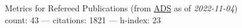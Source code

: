 Metrics for Refereed Publications (from \href{\adsurl}{ADS} as of \textit{2022-11-04}) \\count: 43 --- citations: 1821 --- h-index: 23